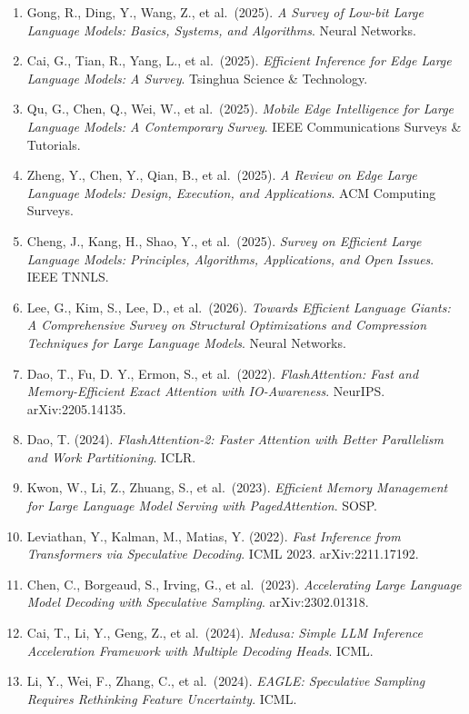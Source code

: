 \begin{enumerate}
  Tang, Y., Wang, Y., Guo, J., et al.~(2024). \emph{A Survey on Transformer Compression}. arXiv:2402.05964.
\item
  Gong, R., Ding, Y., Wang, Z., et al.~(2025). \emph{A Survey of Low-bit Large Language Models: Basics, Systems, and Algorithms}. Neural Networks.
\item
  Cai, G., Tian, R., Yang, L., et al.~(2025). \emph{Efficient Inference for Edge Large Language Models: A Survey}. Tsinghua Science \& Technology.
\item
  Qu, G., Chen, Q., Wei, W., et al.~(2025). \emph{Mobile Edge Intelligence for Large Language Models: A Contemporary Survey}. IEEE Communications Surveys \& Tutorials.
\item
  Zheng, Y., Chen, Y., Qian, B., et al.~(2025). \emph{A Review on Edge Large Language Models: Design, Execution, and Applications}. ACM Computing Surveys.
\item
  Cheng, J., Kang, H., Shao, Y., et al.~(2025). \emph{Survey on Efficient Large Language Models: Principles, Algorithms, Applications, and Open Issues}. IEEE TNNLS.
\item
  Lee, G., Kim, S., Lee, D., et al.~(2026). \emph{Towards Efficient Language Giants: A Comprehensive Survey on Structural Optimizations and Compression Techniques for Large Language Models}. Neural Networks.
\item
  Dao, T., Fu, D. Y., Ermon, S., et al.~(2022). \emph{FlashAttention: Fast and Memory-Efficient Exact Attention with IO-Awareness}. NeurIPS. arXiv:2205.14135.
\item
  Dao, T. (2024). \emph{FlashAttention-2: Faster Attention with Better Parallelism and Work Partitioning}. ICLR.
\item
  Kwon, W., Li, Z., Zhuang, S., et al.~(2023). \emph{Efficient Memory Management for Large Language Model Serving with PagedAttention}. SOSP.
\item
  Leviathan, Y., Kalman, M., Matias, Y. (2022). \emph{Fast Inference from Transformers via Speculative Decoding}. ICML 2023. arXiv:2211.17192.
\item
  Chen, C., Borgeaud, S., Irving, G., et al.~(2023). \emph{Accelerating Large Language Model Decoding with Speculative Sampling}. arXiv:2302.01318.
\item
  Cai, T., Li, Y., Geng, Z., et al.~(2024). \emph{Medusa: Simple LLM Inference Acceleration Framework with Multiple Decoding Heads}. ICML.
\item
  Li, Y., Wei, F., Zhang, C., et al.~(2024). \emph{EAGLE: Speculative Sampling Requires Rethinking Feature Uncertainty}. ICML.

\end{enumerate}
